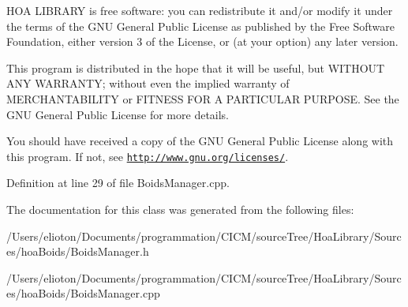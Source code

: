 H\-O\-A L\-I\-B\-R\-A\-R\-Y is free software\-: you can redistribute it and/or modify it under the terms of the G\-N\-U General Public License as published by the Free Software Foundation, either version 3 of the License, or (at your option) any later version.

This program is distributed in the hope that it will be useful, but W\-I\-T\-H\-O\-U\-T A\-N\-Y W\-A\-R\-R\-A\-N\-T\-Y; without even the implied warranty of M\-E\-R\-C\-H\-A\-N\-T\-A\-B\-I\-L\-I\-T\-Y or F\-I\-T\-N\-E\-S\-S F\-O\-R A P\-A\-R\-T\-I\-C\-U\-L\-A\-R P\-U\-R\-P\-O\-S\-E. See the G\-N\-U General Public License for more details.

You should have received a copy of the G\-N\-U General Public License along with this program. If not, see \href{http://www.gnu.org/licenses/}{\tt http\-://www.\-gnu.\-org/licenses/}. 

Definition at line 29 of file Boids\-Manager.\-cpp.



The documentation for this class was generated from the following files\-:\begin{DoxyCompactItemize}
\item 
/\-Users/elioton/\-Documents/programmation/\-C\-I\-C\-M/source\-Tree/\-Hoa\-Library/\-Sources/hoa\-Boids/Boids\-Manager.\-h\item 
/\-Users/elioton/\-Documents/programmation/\-C\-I\-C\-M/source\-Tree/\-Hoa\-Library/\-Sources/hoa\-Boids/Boids\-Manager.\-cpp\end{DoxyCompactItemize}
